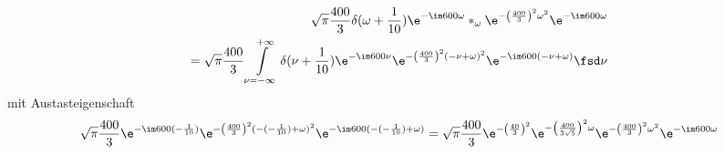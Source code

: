 \begin{ExCalc}
\begin{align}
\sqrt{\pi} \frac{400}{3}
\delta(\omega + \frac{1}{10})\e^{-\im 600 \omega}
\ast_\omega
\e^{-\left(\frac{400}{3}\right)^2 \omega^2} \e^{-\im 600 \omega}\nonumber\\
=\sqrt{\pi} \frac{400}{3} \int\limits_{\nu =-\infty}^{+\infty}
\delta(\nu + \frac{1}{10})\e^{-\im 600 \nu}
\e^{-\left(\frac{400}{3}\right)^2 (-\nu+\omega)^2} \e^{-\im 600 (-\nu+\omega)}\fsd \nu
\end{align}
mit Austasteigenschaft
\begin{align}
\sqrt{\pi} \frac{400}{3}
\e^{-\im 600 (-\frac{1}{10})}
\e^{-\left(\frac{400}{3}\right)^2 (-(-\frac{1}{10})+\omega)^2} \e^{-\im 600 (-(-\frac{1}{10})+\omega)}
=
\sqrt{\pi} \frac{400}{3}
\e^{-\left(\frac{40}{3}\right)^2}
\e^{-\left(\frac{400}{3 \sqrt{5}}\right)^2 \omega}
\e^{-\left(\frac{400}{3}\right)^2 \omega^2}
\e^{-\im 600 \omega}
\end{align}


\end{ExCalc}
